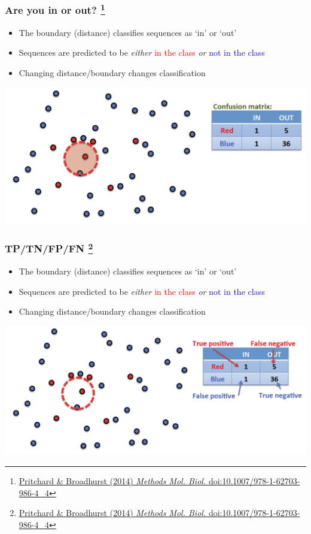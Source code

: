 \begin{frame}
  \frametitle{Are you in or out?
  \footnote{\tiny{\href{http://dx.doi.org/10.1007/978-1-62703-986-4_4}{Pritchard \& Broadhurst (2014) \textit{Methods Mol. Biol.} doi:10.1007/978-1-62703-986-4\_4}}}
}
  \begin{itemize}
    \item \textcolor{hutton_green}{The boundary (distance) classifies sequences as `in' or `out'}
    \item Sequences are predicted to be \textit{either} \textcolor{red}{in the class} \textit{or} \textcolor{blue}{not in the class}
    \item \textcolor{hutton_purple}{Changing distance/boundary changes classification}
  \end{itemize}
  \includegraphics[width=1\textwidth]{images/finding_effectors5}    
\end{frame}

\begin{frame}
  \frametitle{TP/TN/FP/FN
  \footnote{\tiny{\href{http://dx.doi.org/10.1007/978-1-62703-986-4_4}{Pritchard \& Broadhurst (2014) \textit{Methods Mol. Biol.} doi:10.1007/978-1-62703-986-4\_4}}}
}
  \begin{itemize}
    \item \textcolor{hutton_green}{The boundary (distance) classifies sequences as `in' or `out'}
    \item Sequences are predicted to be \textit{either} \textcolor{red}{in the class} \textit{or} \textcolor{blue}{not in the class}
    \item \textcolor{hutton_purple}{Changing distance/boundary changes classification}
  \end{itemize}
  \includegraphics[width=1\textwidth]{images/finding_effectors6}    
\end{frame}


